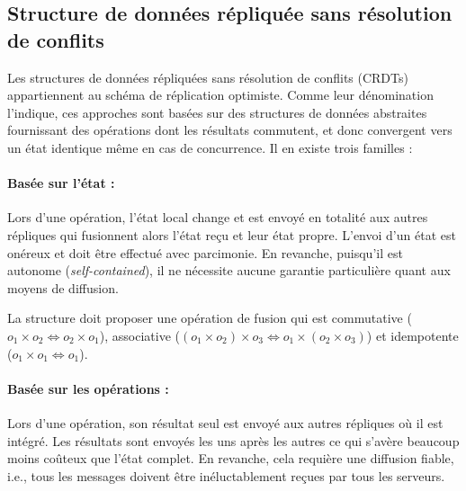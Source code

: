 \subsection{Structure de données répliquée sans résolution de conflits}
\label{repl:subsec:crdts}


Les structures de données répliquées sans résolution de conflits
(CRDTs)~\cite{shapiro2011comprehensive, shapiro2011conflict} appartiennent au
schéma de réplication optimiste. Comme leur dénomination l'indique, ces
approches sont basées sur des structures de données abstraites fournissant des
opérations dont les résultats commutent, et donc convergent vers un état
identique même en cas de concurrence.  Il en existe trois familles :

\paragraph{Basée sur l'état :} Lors d'une opération, l'état local change et est
envoyé en totalité aux autres répliques qui fusionnent alors l'état reçu et leur
état propre. L'envoi d'un état est onéreux et doit être effectué avec
parcimonie. En revanche, puisqu'il est autonome (\emph{self-contained}), il ne
nécessite aucune garantie particulière quant aux moyens de diffusion.

\noindent La structure doit proposer une opération de fusion qui est commutative
($o_1 \times o_2 \Leftrightarrow o_2 \times o_1$), associative
($(o_1 \times o_2) \times o_3 \Leftrightarrow o_1 \times (o_2 \times o_3)$) et
idempotente ($o_1 \times o_1 \Leftrightarrow o_1$).

\paragraph{Basée sur les opérations :} Lors d'une opération, son résultat seul
est envoyé aux autres répliques où il est intégré. Les résultats sont envoyés
les uns après les autres ce qui s'avère beaucoup moins coûteux que l'état
complet. En revanche, cela requière une diffusion fiable, i.e., tous les
messages doivent être inéluctablement reçues par tous les serveurs.

